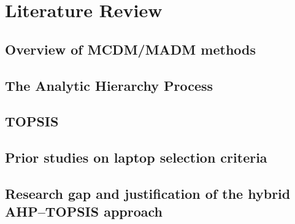\chapter{Literature Review}\label{ch:literature}

\section{Overview of MCDM/MADM methods}\label{sec:mcdm-overview}

\section{The Analytic Hierarchy Process}\label{sec:ahp-theory}

\section{TOPSIS}\label{sec:topsis-theory}

\section{Prior studies on laptop selection criteria}\label{sec:prior-studies}

\section{Research gap and justification of the hybrid AHP--TOPSIS approach}\label{sec:gap}
